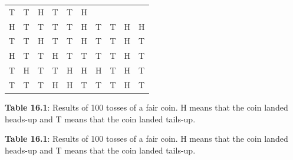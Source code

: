 \begin{description}[noitemsep]
\begin{description}[noitemsep]
\begin{table}[H]
\begin{center}
\begin{xtabular}[t]{|l|l|l|l|l|l|l|l|l|l|}
        T &
        T &
        H &
        T &
        T &
        H%
     \tabularnewline{}
        H &
        T &
        T &
        T &
        T &
        H &
        T &
        T &
        H &
        H%
     \tabularnewline{}
        T &
        T &
        H &
        T &
        T &
        H &
        T &
        T &
        H &
        T%
     \tabularnewline{}
        H &
        T &
        T &
        H &
        T &
        T &
        T &
        T &
        H &
        T%
     \tabularnewline{}
        T &
        H &
        T &
        T &
        H &
        H &
        H &
        T &
        H &
        T%
     \tabularnewline{}
        T &
        T &
        T &
        H &
        H &
        T &
        T &
        T &
        H &
        T%
     \tabularnewline{}
    \end{xtabular}
      \end{center}
    \begin{center}{\small\bfseries Table 16.1}: Results of 100 tosses of a fair coin. H means that the coin landed heads-up and T means that the coin landed tails-up.\end{center}
    \begin{caption}{\small\bfseries Table 16.1}: Results of 100 tosses of a fair coin. H means that the coin landed heads-up and T means that the coin landed tails-up.\end{caption}
\end{table}
    \par
      \label{m39403*uid26}

\end{description}
\end{description}
